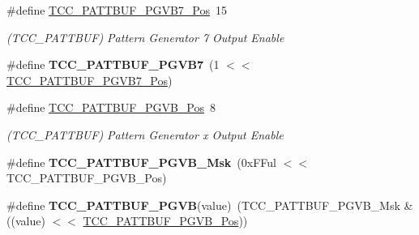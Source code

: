 \begin{DoxyCompactItemize}
\item 
\hypertarget{group___s_a_m_l21___t_c_c_ga5b13a27da246480dca6a702550a31c7a}{}\#define \hyperlink{group___s_a_m_l21___t_c_c_ga5b13a27da246480dca6a702550a31c7a}{T\+C\+C\+\_\+\+P\+A\+T\+T\+B\+U\+F\+\_\+\+P\+G\+V\+B7\+\_\+\+Pos}~15\label{group___s_a_m_l21___t_c_c_ga5b13a27da246480dca6a702550a31c7a}

\begin{DoxyCompactList}\small\item\em (T\+C\+C\+\_\+\+P\+A\+T\+T\+B\+U\+F) Pattern Generator 7 Output Enable \end{DoxyCompactList}\item 
\hypertarget{group___s_a_m_l21___t_c_c_ga33026e395c33c5d05b8bf9eb01b81f38}{}\#define {\bfseries T\+C\+C\+\_\+\+P\+A\+T\+T\+B\+U\+F\+\_\+\+P\+G\+V\+B7}~(1 $<$$<$ \hyperlink{group___s_a_m_l21___t_c_c_ga5b13a27da246480dca6a702550a31c7a}{T\+C\+C\+\_\+\+P\+A\+T\+T\+B\+U\+F\+\_\+\+P\+G\+V\+B7\+\_\+\+Pos})\label{group___s_a_m_l21___t_c_c_ga33026e395c33c5d05b8bf9eb01b81f38}

\item 
\hypertarget{group___s_a_m_l21___t_c_c_gad00d1de8835aed8a9bdcb2df4c84fe6a}{}\#define \hyperlink{group___s_a_m_l21___t_c_c_gad00d1de8835aed8a9bdcb2df4c84fe6a}{T\+C\+C\+\_\+\+P\+A\+T\+T\+B\+U\+F\+\_\+\+P\+G\+V\+B\+\_\+\+Pos}~8\label{group___s_a_m_l21___t_c_c_gad00d1de8835aed8a9bdcb2df4c84fe6a}

\begin{DoxyCompactList}\small\item\em (T\+C\+C\+\_\+\+P\+A\+T\+T\+B\+U\+F) Pattern Generator x Output Enable \end{DoxyCompactList}\item 
\hypertarget{group___s_a_m_l21___t_c_c_ga486cca021895a85b4f09bf9f8913fb7a}{}\#define {\bfseries T\+C\+C\+\_\+\+P\+A\+T\+T\+B\+U\+F\+\_\+\+P\+G\+V\+B\+\_\+\+Msk}~(0x\+F\+Ful $<$$<$ T\+C\+C\+\_\+\+P\+A\+T\+T\+B\+U\+F\+\_\+\+P\+G\+V\+B\+\_\+\+Pos)\label{group___s_a_m_l21___t_c_c_ga486cca021895a85b4f09bf9f8913fb7a}

\item 
\hypertarget{group___s_a_m_l21___t_c_c_gaffda59c2074317938fa98c7550e1f81d}{}\#define {\bfseries T\+C\+C\+\_\+\+P\+A\+T\+T\+B\+U\+F\+\_\+\+P\+G\+V\+B}(value)~(T\+C\+C\+\_\+\+P\+A\+T\+T\+B\+U\+F\+\_\+\+P\+G\+V\+B\+\_\+\+Msk \& ((value) $<$$<$ \hyperlink{group___s_a_m_l21___t_c_c_gad00d1de8835aed8a9bdcb2df4c84fe6a}{T\+C\+C\+\_\+\+P\+A\+T\+T\+B\+U\+F\+\_\+\+P\+G\+V\+B\+\_\+\+Pos}))\label{group___s_a_m_l21___t_c_c_gaffda59c2074317938fa98c7550e1f81d}


\end{DoxyCompactItemize}
